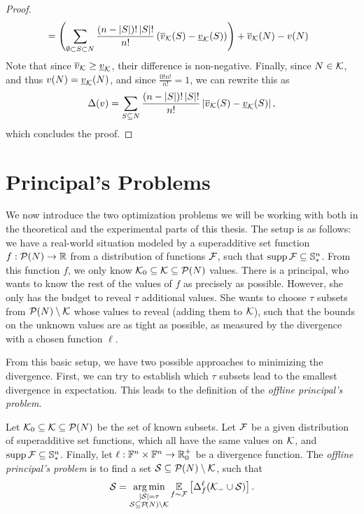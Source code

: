 \begin{proof}
\begin{align*}
	   &= \left( \sum_{\emptyset \subset S \subset N}^{} \frac{\left( n-\left\lvert S \right\rvert \right)! \left\lvert S \right\rvert!}{n!}\left(    \overline{v}_{\mathcal{K}}\!\left(S\right) - \underline{v}_{\mathcal{K}}\!\left(S\right)\right) \right) + \overline{v}_{\mathcal{K}}\!\left(N\right) - v\!\left(N\right)
  \end{align*}
  Note that since $ \overline{v}_{\mathcal{K}} \geq \underline{v}_{\mathcal{K}} $, their difference is non-negative.
  Finally, since $ N \in \mathcal{K} $, and thus $ v\!\left(N\right) = \underline{v}_{\mathcal{K}}\!\left(N\right) $, and since $ \frac{0! n!}{n!} = 1 $, we can rewrite this as \[
  	\Delta\!\left(v\right) = \sum_{S \subseteq N}^{} \frac{\left( n-\left\lvert S \right\rvert \right)! \left\lvert S \right\rvert!}{n!}\left|    \overline{v}_{\mathcal{K}}\!\left(S\right) - \underline{v}_{\mathcal{K}}\!\left(S\right)\right|,
  \]
  which concludes the proof.
\end{proof}

\section{Principal's Problems}
\label{sec:pp}

We now introduce the two optimization problems we will be working with both in the theoretical and the experimental parts of this thesis.
The setup is as follows: we have a real-world situation modeled by a superadditive set function $ f: \mathcal{P}\!\left(N\right) \to \mathbb{R} $ from a distribution of functions $ \mathcal{F} $, such that $ \operatorname{supp} \mathcal{F} \subseteq \mathbb{S}^n_* $.
From this function $ f $, we only know $ \mathcal{K}_0 \subseteq \mathcal{K} \subseteq \mathcal{P}\!\left(N\right) $ values.
There is a principal, who wants to know the rest of the values of $ f $ as precisely as possible.
However, she only has the budget to reveal $ \tau $ additional values.
She wants to choose $ \tau $ subsets from $ \mathcal{P}\!\left(N\right) \setminus \mathcal{K} $ whose values to reveal (adding them to $ \mathcal{K} $), such that the bounds on the unknown values are as tight as possible, as measured by the divergence with a chosen function $ \ell $.

From this basic setup, we have two possible approaches to minimizing the divergence.
First, we can try to establish which $ \tau $ subsets lead to the smallest divergence in expectation.
This leads to the definition of the \emph{offline principal's problem}.

\begin{defi} \label{def:offline-pp}
  Let $ \mathcal{K}_0 \subseteq \mathcal{K} \subseteq \mathcal{P}\!\left(N\right) $ be the set of known subsets.
  Let $ \mathcal{F} $ be a given distribution of superadditive set functions, which all have the same values on $ \mathcal{K} $, and $ \operatorname{supp} \mathcal{F} \subseteq \mathbb{S}^n_* $.
  Finally, let $ \ell: \mathbb{F}^n \times \mathbb{F}^n \to \mathbb{R}^+_0 $ be a divergence function.
  The \emph{offline principal's problem} is to find a set $ \mathcal{S} \subseteq \mathcal{P}\!\left(N\right) \setminus \mathcal{K} $, such that \[
    \mathcal{S} = \operatorname*{arg\,min}_{\substack{\left|{\mathcal{S}}\right| = \tau \\ \mathcal{S} \subseteq \mathcal{P}\!\left(N\right) \setminus \mathcal{K} }} \operatorname*{\mathbb{E}}_{f \sim \mathcal{F}} \left[ \Delta_{f}^{\ell}\!\left(\mathcal{K}_- \cup \mathcal{S}\right) \right].
  \]
\end{defi}

